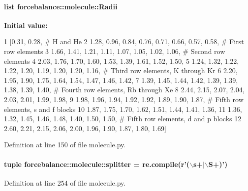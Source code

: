 \hypertarget{namespaceforcebalance_1_1molecule_ae100906fa209012ddf9d4b19ee69b0b7}{
\paragraph[{\-Radii}]{\setlength{\rightskip}{0pt plus 5cm}list {\bf forcebalance\-::molecule\-::\-Radii}}}\label{namespaceforcebalance_1_1molecule_ae100906fa209012ddf9d4b19ee69b0b7}
{\bfseries \-Initial value\-:}
\begin{DoxyCode}
1 [0.31, 0.28, # H and He
2          1.28, 0.96, 0.84, 0.76, 0.71, 0.66, 0.57, 0.58, # First row elements
3          1.66, 1.41, 1.21, 1.11, 1.07, 1.05, 1.02, 1.06, # Second row elements
4          2.03, 1.76, 1.70, 1.60, 1.53, 1.39, 1.61, 1.52, 1.50, 
5          1.24, 1.32, 1.22, 1.22, 1.20, 1.19, 1.20, 1.20, 1.16, # Third row
       elements, K through Kr
6          2.20, 1.95, 1.90, 1.75, 1.64, 1.54, 1.47, 1.46, 1.42, 
7          1.39, 1.45, 1.44, 1.42, 1.39, 1.39, 1.38, 1.39, 1.40, # Fourth row
       elements, Rb through Xe
8          2.44, 2.15, 2.07, 2.04, 2.03, 2.01, 1.99, 1.98, 
9          1.98, 1.96, 1.94, 1.92, 1.92, 1.89, 1.90, 1.87, # Fifth row elements,
       s and f blocks
10          1.87, 1.75, 1.70, 1.62, 1.51, 1.44, 1.41, 1.36, 
11          1.36, 1.32, 1.45, 1.46, 1.48, 1.40, 1.50, 1.50, # Fifth row elements,
       d and p blocks
12          2.60, 2.21, 2.15, 2.06, 2.00, 1.96, 1.90, 1.87, 1.80, 1.69]
\end{DoxyCode}


\-Definition at line 150 of file molecule.\-py.

\hypertarget{namespaceforcebalance_1_1molecule_a41b84501c57b5adca693580d4c27d099}{
\paragraph[{splitter}]{\setlength{\rightskip}{0pt plus 5cm}tuple {\bf forcebalance\-::molecule\-::splitter} = re.\-compile(r'($\backslash$s+$|$$\backslash$\-S+)')}}\label{namespaceforcebalance_1_1molecule_a41b84501c57b5adca693580d4c27d099}


\-Definition at line 254 of file molecule.\-py.

